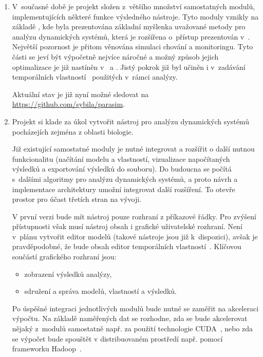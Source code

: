 \documentclass[a4paper]{article}
\begin{document}
\begin{enumerate}
\item   V~současné době je projekt složen z~většího množství samostatných modulů,
        implementujících některé funkce výsledného nástroje. Tyto moduly vznikly
        na základě \cite{drazan_master}, kde byla prezentována základní myšlenka
        uvažované metody pro analýzu dynamických systémů, která je rozšířena o~přístup
        prezentován v~\cite{odkaz na popis robustnosti}. Největší pozornost je přitom
        věnována simulaci chování a monitoringu. Tyto části se jeví být výpočetně
        nejvíce náročné a možný způsob jejich optimalizace je již nastíněn v~\cite{papousek_bachelor}
        a \cite{kovacik_bachelor}. Jistý pokrok již byl učiněn i v~zadávání temporálních
        vlastností~\cite{vejpustek_bachelor} použitých v~rámci analýzy.

        Aktuální stav je již nyní možné sledovat na \url{https://github.com/sybila/parasim}.

\item   Projekt si klade za úkol vytvořit nástroj pro analýzu dynamických systémů
        pocházejích zejména z oblasti biologie.

        Již existující samostatné moduly je nutné integrovat a rozšířit o další
        nutnou funkcionalitu (načítání modelu a vlastností, vizualizace napočítaných
        výsledků a exportování výsledků do souboru). Do budoucna se počítá s~dalšími
        algoritmy pro analýzu dynamických systémů, a proto návrh a implementace
        architektury umožní integrovat další rozšíření. To otevře prostor pro účast
        třetích stran na vývoji.

        V první verzi bude mít nástroj pouze rozhraní z příkazové řádky. Pro zvýšení
        přístupnosti však musí nástroj obsah i grafické uživatelské rozhraní. Není
        v~plánu vytvořit editor modelů (takové nástroje jsou již k~dispozici),
        avšak je pravděpodobné, že bude obsah editor temporálních vlastností~\cite{vejpustek_bachelor}. 
        Klíčovou součástí grafického rozhraní jsou:
        \begin{itemize}
            \item   zobrazení výsledků analýzy,
            \item   sdružení a správa modelů, vlastností a výsledků.
        \end{itemize}

        Po úspěšné integraci jednotlivých modulů bude nutné se zaměřit na akceleraci
        výpočtu. Na základě naměřených dat se rozhodne, zda se bude akcelerovat
        nějaký z~modulů samostatně např. za použití technologie CUDA~\cite{cuda_doc},
        nebo zda se výpočet bude spouštět v distribuovaném prostředí např. pomocí frameworku
        Hadoop~\cite{hadoop_book}.


\end{enumerate}
\end{document}
